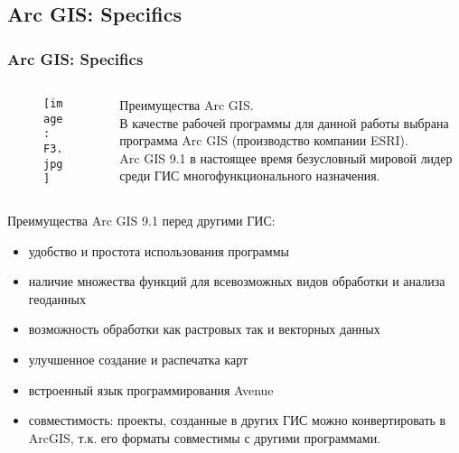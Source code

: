 \documentclass[pdflatex,compress,8pt,
	xcolor={dvipsnames,dvipsnames,svgnames,x11names,table},
	hyperref={	 
	pdfauthor={Lemenkova Polina}, 
	pdfsubject={Preentation}, 
	pdfcreator={Lemenkova Polina}, 
	pdfproducer={Lemenkova Polina}, 
	colorlinks=true,
	linkcolor=Red3, 
	citecolor=NavyBlue, 
	urlcolor = NavyBlue, 
	breaklinks = true}]{beamer}
\begin{document}
\subsection{Arc GIS: Specifics}
\begin{frame}\frametitle{Arc GIS: Specifics}
	\begin{minipage}[0.4\textheight]{\textwidth}
		\begin{columns}[T]
			\begin{column}{0.5\textwidth}
				\begin{figure}[H]
					\centering
					\texttt{[image: F3.jpg]}
				\end{figure}
			\end{column}
			\begin{column}{0.5\textwidth}
			\vspace{2em}
Преимущества Arc GIS. \\
В качестве рабочей программы для данной работы выбрана программа \alert{Arc GIS} (производство компании ESRI). \\
Arc GIS 9.1 в настоящее время безусловный мировой лидер среди ГИС многофункционального назначения. 
			\end{column}
		\end{columns}
	\end{minipage}
	
Преимущества Arc GIS 9.1 перед другими ГИС:

\begin{itemize}
	\item удобство и простота использования программы
	\item наличие множества функций для всевозможных видов обработки и анализа геоданных
	\item возможность обработки как растровых так и векторных данных
	\item улучшенное создание и распечатка карт
	\item встроенный язык программирования Avenue 
	\item совместимость: проекты, созданные в других ГИС можно конвертировать в ArcGIS, т.к. его форматы совместимы с другими программами.
\end{itemize}
   
\end{frame}
\end{document}
